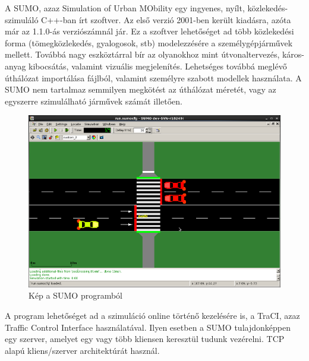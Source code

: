 A SUMO, azaz Simulation of Urban MObility egy ingyenes, nyílt, közlekedés-szimuláló C++-ban írt szoftver\cite{SUMO}. Az első verzió 2001-ben került kiadásra, azóta már az 1.1.0-ás verziószámnál jár. Ez a szoftver lehetőséget ad több közlekedési forma (tömegközlekedés, gyalogosok, stb)
modelezzésére a személygépjárművek mellett. Továbbá nagy eszköztárral bír az olyanokhoz mint útvonaltervezés, káros-anyag kibocsátás, valamint vizuális megjelenítés.
Lehetséges továbbá meglévő úthálózat importálása fájlból, valamint személyre szabott modellek használata. A SUMO nem tartalmaz semmilyen megkötést az úthálózat méretét, vagy az egyszerre szimulálható járművek számát illetően.
\begin{figure}[H]
\includegraphics[width=\linewidth]{SUMO.png}
\caption{Kép a SUMO programból\cite{sumopic}}
\label{fig:SUMO}
\end{figure}

A program lehetőséget ad a szimuláció online történő kezelésére is, a TraCI, azaz Traffic Control Interface használatával. Ilyen esetben a SUMO tulajdonképpen egy szerver, amelyet
egy vagy több kliensen keresztül tudunk vezérelni. TCP alapú kliens/szerver architektúrát használ. 

